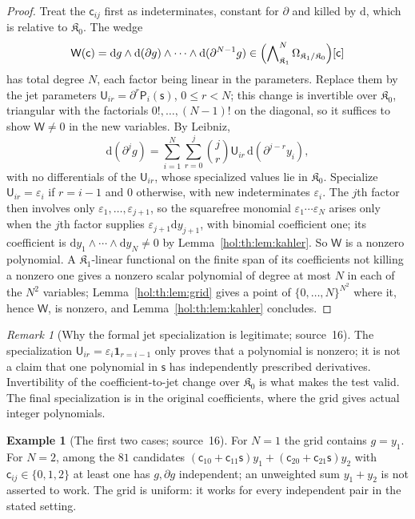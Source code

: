 \documentclass[11pt]{article}
\numberwithin{equation}{section}
\theoremstyle{definition}
\newtheorem{example}[theorem]{Example}
\theoremstyle{remark}
\newtheorem{remark}[theorem]{Remark}
\begin{document}
\begin{proof}
Treat the $\mathsf c_{ij}$ first as indeterminates, constant for $\partial$
and killed by $\mathrm d$, which is relative to $\mathfrak K_0$. The wedge
\[
 \mathsf W(\mathbf{\mathsf c})=\mathrm dg\wedge\mathrm d(\partial g)\wedge\cdots
 \wedge\mathrm d(\partial^{N-1}g)\in\Bigl(\bigwedge\nolimits^N_{\mathfrak K_1}
 \Omega_{\mathfrak K_1/\mathfrak K_0}\Bigr)[\mathbf{\mathsf c}]
\]
has total degree $N$, each factor being linear in the parameters. Replace them
by the jet parameters $\mathsf U_{ir}=\partial^r\mathsf P_i(\mathsf s)$,
$0\le r<N$; this change is invertible over $\mathfrak K_0$, triangular with the
factorials $0!,\ldots,(N-1)!$ on the diagonal, so it suffices to show
$\mathsf W\ne0$ in the new variables. By Leibniz,
\[
 \mathrm d(\partial^jg)=\sum_{i=1}^N\sum_{r=0}^j\binom jr\mathsf U_{ir}\,
 \mathrm d(\partial^{j-r}y_i),
\]
with no differentials of the $\mathsf U_{ir}$, whose specialized values lie in
$\mathfrak K_0$. Specialize $\mathsf U_{ir}=\varepsilon_i$ if $r=i-1$ and $0$
otherwise, with new indeterminates $\varepsilon_i$. The $j$th factor then
involves only $\varepsilon_1,\ldots,\varepsilon_{j+1}$, so the squarefree
monomial $\varepsilon_1\cdots\varepsilon_N$ arises only when the $j$th factor
supplies $\varepsilon_{j+1}\mathrm dy_{j+1}$, with binomial coefficient one; its
coefficient is $\mathrm dy_1\wedge\cdots\wedge\mathrm dy_N\ne0$ by
Lemma~\ref{hol:th:lem:kahler}. So $\mathsf W$ is a nonzero polynomial. A
$\mathfrak K_1$-linear functional on the finite span of its coefficients not
killing a nonzero one gives a nonzero scalar polynomial of degree at most $N$
in each of the $N^2$ variables; Lemma~\ref{hol:th:lem:grid} gives a point of
$\{0,\ldots,N\}^{N^2}$ where it, hence $\mathsf W$, is nonzero, and
Lemma~\ref{hol:th:lem:kahler} concludes.
\end{proof}

\begin{remark}[Why the formal jet specialization is legitimate; source~16]
\label{hol:th:rem:specialization}
The specialization $\mathsf U_{ir}=\varepsilon_i\mathbf 1_{r=i-1}$ only proves
that a polynomial is nonzero; it is not a claim that one polynomial in
$\mathsf s$ has independently prescribed derivatives. Invertibility of the
coefficient-to-jet change over $\mathfrak K_0$ is what makes the test valid.
The final specialization is in the original coefficients, where the grid gives
actual integer polynomials.
\end{remark}

\begin{example}[The first two cases; source~16]\label{hol:th:ex:small}
For $N=1$ the grid contains $g=y_1$. For $N=2$, among the $81$ candidates
$(\mathsf c_{10}+\mathsf c_{11}\mathsf s)y_1+(\mathsf c_{20}+\mathsf c_{21}
\mathsf s)y_2$ with $\mathsf c_{ij}\in\{0,1,2\}$ at least one has $g,\partial
g$ independent; an unweighted sum $y_1+y_2$ is not asserted to work. The grid
is uniform: it works for every independent pair in the stated setting.
\end{example}
\end{document}
